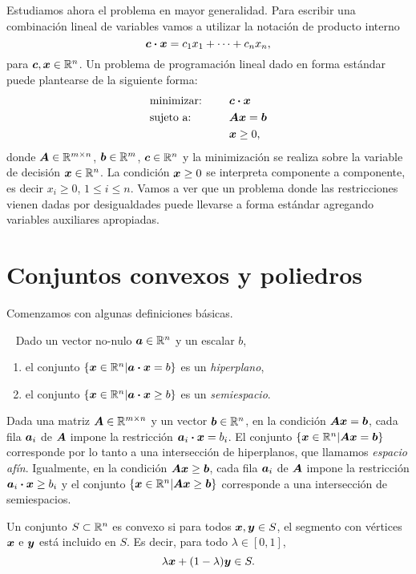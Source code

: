 Estudiamos ahora el problema en mayor generalidad. Para escribir una combinación lineal de variables vamos a utilizar la notación de producto interno
$$\bm{c} \boldsymbol{\cdot} \bm{x} = c_1 x_1 + \dots + c_n x_n,$$
para $\bm{c}, \bm{x} \in \mathbb{R}^n$.
Un problema de programaci\'on lineal dado en forma est\'andar puede plantearse de la siguiente forma:
\begin{alignat*}{2}
  & \text{minimizar: } & & \bm{c} \boldsymbol{\cdot} \bm{x} \\
   & \text{sujeto a: } & \quad & \bm{A}\bm{x} = \bm{b} \\
   & & & \bm{x} \ge 0,
\end{alignat*}
donde $\bm{A} \in \mathbb{R}^{m \times n}$, $\bm{b} \in \mathbb{R}^m$, $\bm{c} \in \mathbb{R}^n$ y la minimizaci\'on se realiza sobre la variable de decisi\'on $\bm{x} \in \mathbb{R}^n$. La condici\'on $\bm{x} \ge 0$ se interpreta componente a componente, es decir $x_i \ge 0$, $1 \le i \le n$. Vamos a ver que un problema donde las restricciones vienen dadas por desigualdades puede llevarse a forma estándar agregando variables auxiliares apropiadas.

\section{Conjuntos convexos y poliedros}

Comenzamos con algunas definiciones básicas.

\begin{definition}~
Dado un vector no-nulo $\bm{a} \in \mathbb{R}^n$ y un escalar $b$,
  \begin{enumerate}
  \item el conjunto $\{\bm{x} \in \mathbb{R}^n | \bm{a} \boldsymbol{\cdot} \bm{x} = b\}$ es un \emph{hiperplano},
  \item el conjunto $\{\bm{x} \in \mathbb{R}^n | \bm{a} \boldsymbol{\cdot} \bm{x} \ge b\}$ es un \emph{semiespacio}.
  \end{enumerate}
\end{definition}

Dada una matriz $\bm{A} \in \mathbb{R}^{m \times n}$ y un vector $\bm{b} \in \mathbb{R}^n$, en la condición $\bm{A} \bm{x} = \bm{b}$, cada fila $\bm{a}_i$ de $\bm{A}$ impone la restricción $\bm{a}_i \boldsymbol{\cdot} \bm{x} = b_i$. El conjunto $\{\bm{x} \in \mathbb{R}^n | \bm{A} \bm{x} = \bm{b}\}$ corresponde por lo tanto a una intersección de hiperplanos, que llamamos \emph{espacio afín}. Igualmente, en la condición $\bm{A} \bm{x} \ge \bm{b}$, cada fila $\bm{a}_i$ de $\bm{A}$ impone la restricción $\bm{a}_i \boldsymbol{\cdot} \bm{x} \ge b_i$ y el conjunto $\{\bm{x} \in \mathbb{R}^n | \bm{A} \bm{x} \ge \bm{b}\}$ corresponde a una intersección de semiespacios.

\begin{definition}
Un conjunto $S \subset \mathbb{R}^n$ es convexo si para todos $\bm{x}, \bm{y} \in S$, el segmento con vértices $\bm{x}$ e $\bm{y}$ está incluido en $S$. Es decir, para todo $\lambda \in [0, 1]$,
$$
\lambda \bm{x} + (1-\lambda) \bm{y} \in S.
$$
\end{definition}


